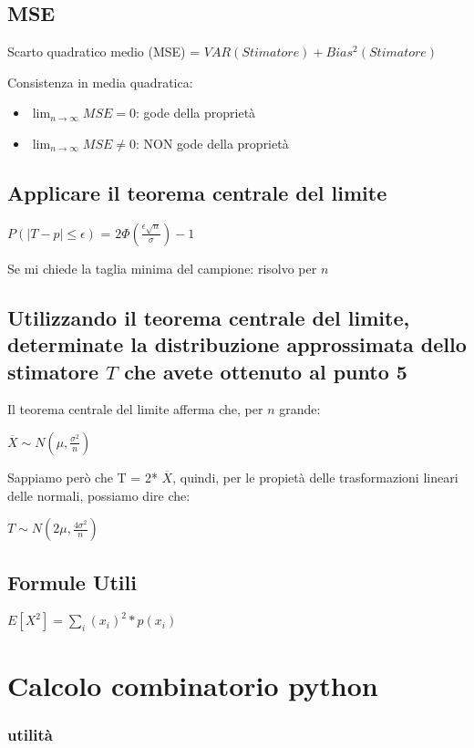 \documentclass{article}
\begin{document}
\subsection*{MSE}

Scarto quadratico medio (MSE) = $VAR(Stimatore) + Bias^2(Stimatore)$

Consistenza in media quadratica:

\begin{itemize}
    \item $\lim_{n \to \infty}MSE = 0$: gode della proprietà
    \item $\lim_{n \to \infty}MSE \neq 0$: NON gode della proprietà
\end{itemize}

\subsection*{Applicare il teorema centrale del limite}

$P(|T - p| \leq \epsilon)$ = $2\Phi(\frac{\epsilon\sqrt{n}}{\sigma}) - 1$

Se mi chiede la taglia minima del campione: risolvo per $n$

\subsection*{Utilizzando il teorema centrale del limite, determinate la distribuzione approssimata dello stimatore $T$ che avete ottenuto al punto 5}

Il teorema centrale del limite afferma che, per $n$ grande:

$\overline{X} \sim N(\mu, \frac{\sigma^2}{n})$

Sappiamo però che T = 2* $\overline{X}$, quindi, per le propietà delle trasformazioni lineari delle normali, possiamo dire che:

$T \sim N (2 \mu, \frac{4 \sigma^2}{n})$

\subsection*{Formule Utili}

$E[X^2] = \sum_{i}(x_i)^2*p(x_i)$

\section{Calcolo combinatorio python}

\subsubsection*{utilità}
\end{document}
